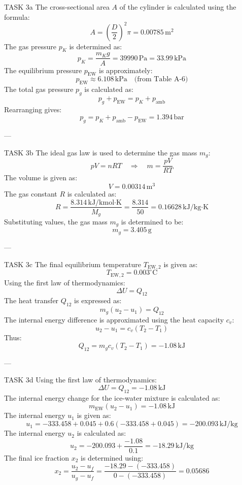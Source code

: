 TASK 3a  
The cross-sectional area \( A \) of the cylinder is calculated using the formula:  
\[
A = \left(\frac{D}{2}\right)^2 \pi = 0.00785 \, \text{m}^2
\]  
The gas pressure \( p_K \) is determined as:  
\[
p_K = \frac{m_K g}{A} = 39990 \, \text{Pa} = 33.99 \, \text{kPa}
\]  
The equilibrium pressure \( p_{\text{EW}} \) is approximately:  
\[
p_{\text{EW}} \approx 6.108 \, \text{kPa} \quad \text{(from Table A-6)}
\]  
The total gas pressure \( p_g \) is calculated as:  
\[
p_g + p_{\text{EW}} = p_K + p_{\text{amb}}
\]  
Rearranging gives:  
\[
p_g = p_K + p_{\text{amb}} - p_{\text{EW}} = 1.394 \, \text{bar}
\]  

---

TASK 3b  
The ideal gas law is used to determine the gas mass \( m_g \):  
\[
p V = n R T \quad \Rightarrow \quad m = \frac{p V}{R T}
\]  
The volume is given as:  
\[
V = 0.00314 \, \text{m}^3
\]  
The gas constant \( R \) is calculated as:  
\[
R = \frac{8.314 \, \text{kJ}/\text{kmol·K}}{M_g} = \frac{8.314}{50} = 0.16628 \, \text{kJ}/\text{kg·K}
\]  
Substituting values, the gas mass \( m_g \) is determined to be:  
\[
m_g = 3.405 \, \text{g}
\]  

---

TASK 3c  
The final equilibrium temperature \( T_{\text{EW},2} \) is given as:  
\[
T_{\text{EW},2} = 0.003^\circ\text{C}
\]  
Using the first law of thermodynamics:  
\[
\Delta U = Q_{12}
\]  
The heat transfer \( Q_{12} \) is expressed as:  
\[
m_g (u_2 - u_1) = Q_{12}
\]  
The internal energy difference is approximated using the heat capacity \( c_v \):  
\[
u_2 - u_1 = c_v (T_2 - T_1)
\]  
Thus:  
\[
Q_{12} = m_g c_v (T_2 - T_1) = -1.08 \, \text{kJ}
\]  

---

TASK 3d  
Using the first law of thermodynamics:  
\[
\Delta U = Q_{12} = -1.08 \, \text{kJ}
\]  
The internal energy change for the ice-water mixture is calculated as:  
\[
m_{\text{EW}} (u_2 - u_1) = -1.08 \, \text{kJ}
\]  
The internal energy \( u_1 \) is given as:  
\[
u_1 = -333.458 + 0.045 + 0.6(-333.458 + 0.045) = -200.093 \, \text{kJ}/\text{kg}
\]  
The internal energy \( u_2 \) is calculated as:  
\[
u_2 = -200.093 + \frac{-1.08}{0.1} = -18.29 \, \text{kJ}/\text{kg}
\]  
The final ice fraction \( x_2 \) is determined using:  
\[
x_2 = \frac{u_2 - u_f}{u_g - u_f} = \frac{-18.29 - (-333.458)}{0 - (-333.458)} = 0.05686
\]  
